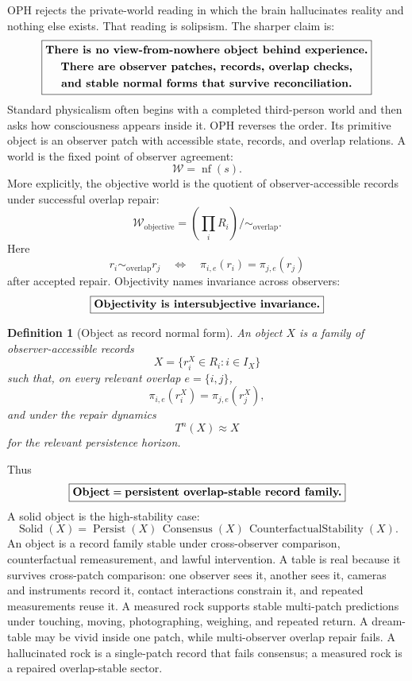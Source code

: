 \documentclass[11pt]{article}
\newtheorem{definition}[theorem]{Definition}
\theoremstyle{remark}
\theoremstyle{plain}
\begin{document}
OPH rejects the private-world reading in which the brain hallucinates reality and nothing else exists. That reading is solipsism. The sharper claim is:
\[
\boxed{
\begin{gathered}
\text{\bfseries There is no view-from-nowhere object behind experience.}\\
\text{\bfseries There are observer patches, records, overlap checks,}\\
\text{\bfseries and stable normal forms that survive reconciliation.}
\end{gathered}
}
\]
Standard physicalism often begins with a completed third-person world and then asks how consciousness appears inside it. OPH reverses the order. Its primitive object is an observer patch with accessible state, records, and overlap relations. A world is the fixed point of observer agreement:
\[
\boxed{
\mathcal W=\operatorname{nf}(s).
}
\]
More explicitly, the objective world is the quotient of observer-accessible records under successful overlap repair:
\[
\boxed{
\mathcal W_{\mathrm{objective}}
=
\left(\prod_i R_i\right)\big/\!\sim_{\mathrm{overlap}}.
}
\]
Here
\[
r_i\sim_{\mathrm{overlap}} r_j
\quad\Longleftrightarrow\quad
\pi_{i,e}(r_i)=\pi_{j,e}(r_j)
\]
after accepted repair. Objectivity names invariance across observers:
\[
\boxed{
\text{\bfseries Objectivity is intersubjective invariance.}
}
\]

\begin{definition}[Object as record normal form]
An object \(X\) is a family of observer-accessible records
\[
X=\{r_i^X\in R_i:i\in I_X\}
\]
such that, on every relevant overlap \(e=\{i,j\}\),
\[
\pi_{i,e}(r_i^X)=\pi_{j,e}(r_j^X),
\]
and under the repair dynamics
\[
T^n(X)\approx X
\]
for the relevant persistence horizon.
\end{definition}

Thus
\[
\boxed{
\text{\bfseries Object}=\text{\bfseries persistent overlap-stable record family.}
}
\]
A solid object is the high-stability case:
\[
\operatorname{Solid}(X)
=
\operatorname{Persist}(X)\,
\operatorname{Consensus}(X)\,
\operatorname{CounterfactualStability}(X).
\]
An object is a record family stable under cross-observer comparison, counterfactual remeasurement, and lawful intervention. A table is real because it survives cross-patch comparison: one observer sees it, another sees it, cameras and instruments record it, contact interactions constrain it, and repeated measurements reuse it. A measured rock supports stable multi-patch predictions under touching, moving, photographing, weighing, and repeated return. A dream-table may be vivid inside one patch, while multi-observer overlap repair fails. A hallucinated rock is a single-patch record that fails consensus; a measured rock is a repaired overlap-stable sector.
\end{document}
